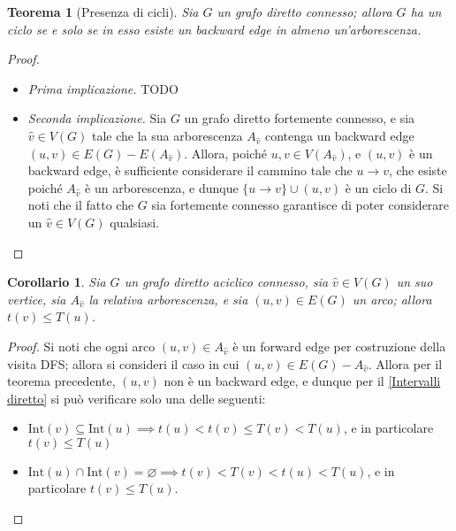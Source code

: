 \documentclass[14pt]{extreport}
\newtheorem{theorem}{Teorema}[subsection]
\newtheorem{corollary}{Corollario}[subsection]
\theoremstyle{definition}
\theoremstyle{definition}
\begin{document}
\begin{theorem}[Presenza di cicli]
    \label{Cicli diretto}
    Sia $G$ un grafo diretto connesso; allora $G$ ha un ciclo se e solo se in esso esiste un backward edge in almeno un'arborescenza.
\end{theorem}

\begin{proof}
    \hspace{0.7cm}
    \begin{itemize}
        \item[] \textit{Prima implicazione.} TODO
        \item[] \textit{Seconda implicazione.} Sia $G$ un grafo diretto fortemente connesso, e sia $\hat v \in V(G)$ tale che la sua arborescenza $A_{\hat v}$ contenga un backward edge $(u, v) \in E(G) - E(A_{\hat v})$. Allora, poiché $u, v \in V(A_{\hat v})$, e $(u, v)$ è un backward edge, è sufficiente considerare il cammino tale che $u \rightarrow v$, che esiste poiché $A_{\hat v}$ è un arborescenza, e dunque $\{u \rightarrow v\} \cup (u, v)$ è un ciclo di $G$. Si noti che il fatto che $G$ sia fortemente connesso garantisce di poter considerare un $\hat v \in V(G)$ qualsiasi.
    \end{itemize}
\end{proof}

\begin{corollary}
    Sia $G$ un grafo diretto aciclico connesso, sia $\hat v \in V(G)$ un suo vertice, sia $A_{\hat v}$ la relativa arborescenza, e sia $(u, v) \in E(G)$ un arco; allora $t(v) \le T(u)$.
\end{corollary}

\begin{proof}
    Si noti che ogni arco $(u, v) \in A_{\hat v}$ è un forward edge per costruzione della visita DFS; allora si consideri il caso in cui $(u, v) \in E(G) - A_{\hat v}$. Allora per il teorema precedente, $(u, v)$ non è un backward edge, e dunque per il \cref{Intervalli diretto} si può verificare solo una delle seguenti:
    \begin{itemize}
        \item $\mathrm{Int}(v) \subseteq \mathrm{Int}(u) \implies t(u) < t(v) \le T(v) < T(u)$, e in particolare $t(v) \le T(u)$
        \item $\mathrm{Int}(u) \cap \mathrm{Int}(v) = \varnothing \implies t(v) < T(v) < t(u) < T(u)$, e in particolare $t(v) \le T(u)$.
    \end{itemize}
\end{proof}
\end{document}
